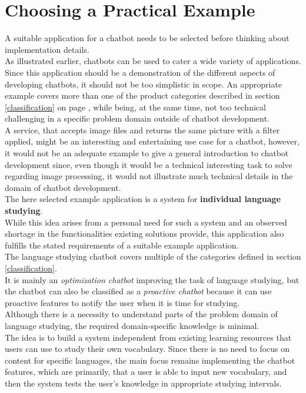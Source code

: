 \section{Choosing a Practical Example}


A suitable application for a chatbot needs to be selected before thinking about implementation details.
\\
As illustrated earlier, chatbots can be used to cater a wide variety of applications.
\\

Since this application should be a demonstration of the different aspects of developing chatbots,
it should not be too simplistic in scope.
An appropriate example covers more than one of the product categories described in section \ref{classification} on page \pageref{classification},
while being, at the same time, not too technical challenging in a specific  problem domain outside of chatbot development.
\\
A service, that accepts image files and returns the same picture with a filter applied,
might be an interesting and entertaining use case for a chatbot,
however, it would not be an adequate example to give a general introduction to chatbot development since,
even though it would be a technical interesting task to solve regarding image processing,
it would not illustrate much technical details in the domain of chatbot development.
\\

The here selected example application is a system for \textbf{individual language studying}.
\\
While this idea arises from a personal need for such a system and an observed shortage in the functionalities existing solutions provide,
this application also fulfills the stated requirements of a suitable example application.
\\

The language studying chatbot covers multiple of the categories defined in section \ref{classification}.
\\
It is mainly an \emph{optimization chatbot} improving the task of language studying,
but the chatbot can also be classified as a \emph{proactive chatbot} because it can use proactive features to notify the user when it is time for studying.
\\

Although there is a necessity to understand parts of the problem domain of language studying,
the required domain-specific knowledge is minimal.
\\

The idea is to build a system independent from existing learning resources that users can use to study their own vocabulary.
Since there is no need to focus on content for specific languages, the main focus remains implementing the chatbot features,
which are primarily, that a user is able to input new vocabulary, and then the system tests the user's knowledge in appropriate studying intervals.
